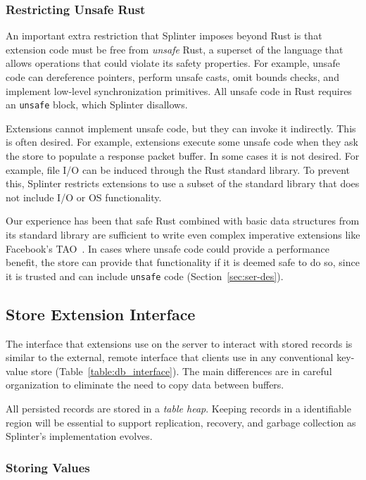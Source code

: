 \subsubsection{Restricting Unsafe Rust}
\label{sec:unsafe}

An important extra restriction that Splinter imposes beyond Rust is that
  extension code must be free from \emph{unsafe} Rust, a superset of the
  language that allows
  operations that could violate its safety properties.
For example, unsafe code can dereference pointers, perform unsafe casts, omit
  bounds checks, and implement low-level synchronization primitives.
All unsafe code in Rust requires an \texttt{unsafe} block, which
Splinter disallows.

Extensions cannot implement unsafe code, but they can invoke it indirectly.
This is often desired.
For example, extensions execute some unsafe code when they ask the store to
  populate a response packet buffer.
In some cases it is not desired.
For example, file I/O can be induced through the Rust standard
  library.
To prevent this, Splinter restricts extensions to use a subset of the standard
  library that does not include I/O or OS functionality.

Our experience has been that safe Rust combined with basic data structures from
  its standard library are sufficient to write even complex imperative extensions
  like Facebook's TAO~\cite{tao-2013}.
In cases where unsafe code could provide a performance benefit, the store can
  provide that functionality if it is deemed safe to do so, since it is trusted
  and can include \texttt{unsafe} code (Section~\ref{sec:ser-des}).

\subsection{Store Extension Interface}
\label{sec:db-iface}

The interface that extensions use on the server to interact with stored records is similar to
  the external, remote interface that clients use in any conventional key-value
  store (Table~\ref{table:db_interface}).
The main differences are in careful organization to eliminate the need to copy
  data between buffers.

All persisted records are stored in a \emph{table heap}.
Keeping records in a identifiable region will be essential to support
  replication, recovery, and garbage collection as Splinter's implementation
  evolves.

\subsubsection{Storing Values}

